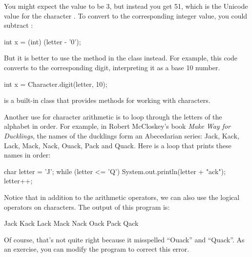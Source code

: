 You might expect the value to be 3, but instead you get 51, which is the Unicode value for the character .
To convert  to the corresponding integer value, you could subtract :

\begin{code}
    int x = (int) (letter - '0');
\end{code}

But it is better to use the  method in the  class instead.
For example, this code converts  to the corresponding digit, interpreting it as a base 10 number.

\begin{code}
    int x = Character.digit(letter, 10);
\end{code}

 is a built-in class that provides methods for working with characters.

Another use for character arithmetic is to loop through the letters of the alphabet in order.
For example, in Robert McCloskey's book {\em Make Way for Ducklings}, the names of the ducklings form an Abecedarian series: Jack, Kack, Lack, Mack, Nack, Ouack, Pack and Quack.
Here is a loop that prints these names in order:

\begin{code}
    char letter = 'J';
    while (letter <= 'Q') {
        System.out.println(letter + "ack");
        letter++;
    }
\end{code}

Notice that in addition to the arithmetic operators, we can also use the logical operators on characters.
The output of this program is:

\begin{stdout}
Jack
Kack
Lack
Mack
Nack
Oack
Pack
Qack
\end{stdout}

Of course, that's not quite right because it misspelled ``Ouack'' and ``Quack''.
As an exercise, you can modify the program to correct this error.



